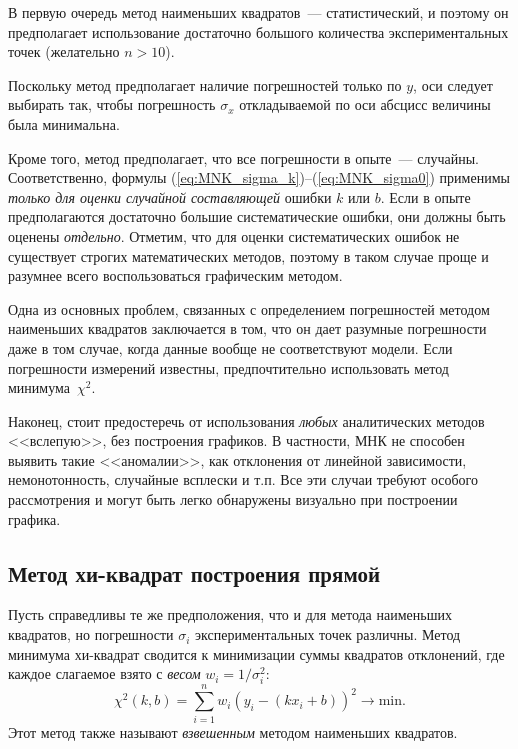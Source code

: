 
В первую очередь метод наименьших квадратов~--- статистический,
и поэтому он предполагает использование достаточно большого количества
экспериментальных точек (желательно $n>10$).

Поскольку метод предполагает наличие погрешностей только по $y$,
оси следует выбирать так, чтобы погрешность $\sigma_{x}$ откладываемой
по оси абсцисс величины была минимальна.

Кроме того, метод предполагает, что все погрешности в опыте~---
случайны. Соответственно, формулы (\ref{eq:MNK_sigma_k})--(\ref{eq:MNK_sigma0})
применимы \emph{только для оценки случайной составляющей} ошибки $k$
или $b$. Если в опыте предполагаются достаточно большие систематические
ошибки, они должны быть оценены \emph{отдельно}. Отметим, что для
оценки систематических ошибок не существует строгих математических
методов, поэтому в таком случае проще и разумнее всего воспользоваться
графическим методом.

Одна из основных проблем, связанных с определением погрешностей методом
наименьших квадратов заключается в том, что он дает разумные погрешности даже в
том случае, когда данные вообще не соответствуют модели.
Если погрешности измерений известны, предпочтительно использовать
метод минимума~$\chi^2$.

Наконец, стоит предостеречь от использования \emph{любых} аналитических
методов <<вслепую>>, без построения графиков. В частности, МНК не способен
выявить такие <<аномалии>>, как отклонения от линейной зависимости,
немонотонность, случайные всплески и т.п. Все эти случаи требуют особого
рассмотрения и могут быть легко обнаружены визуально при построении графика.




\subsection{Метод хи-квадрат построения прямой}
Пусть справедливы те же предположения, что и для метода наименьших квадратов,
но погрешности $\sigma_{i}$ экспериментальных точек различны. Метод
минимума хи-квадрат сводится к минимизации суммы квадратов отклонений,
где каждое слагаемое взято с \emph{весом} $w_i = 1/\sigma_i^2$:
 \[
 \chi^2(k,b)=\sum\limits _{i=1}^{n}w_{i} \left(y_i-(kx_i+b)\right)^{2}\to\mathrm{min}.
\]
Этот метод также называют \emph{взвешенным} методом наименьших квадратов.

